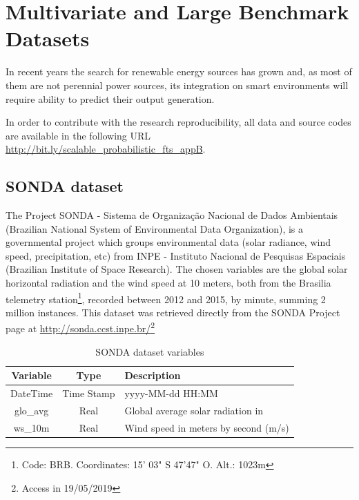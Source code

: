 \chapter{Multivariate and Large Benchmark Datasets}
\label{apd:multivariate_datasets}

In recent years the search for renewable energy sources has grown and, as most of them are not perennial power sources, its integration on smart environments will require ability to predict their output generation.

In order to contribute with the research reproducibility, all data and source codes are available in the following URL \url{http://bit.ly/scalable_probabilistic_fts_appB}.


\section{SONDA dataset}

The Project SONDA - Sistema de Organização Nacional de Dados Ambientais (Brazilian National System of Environmental Data Organization), is a governmental project which groups environmental data (solar radiance, wind speed, precipitation, etc) from INPE - Instituto Nacional de Pesquisas Espaciais (Brazilian Institute of Space Research). The chosen variables are the global solar horizontal radiation and the wind speed at 10 meters, both from the Brasilia telemetry station\footnote{Code: BRB. Coordinates: 15' 03" S 47'47" O. Alt.: 1023m}, recorded between 2012 and 2015, by minute, summing 2 million instances. This dataset was retrieved directly from the SONDA Project page at \url{http://sonda.ccst.inpe.br/}\footnote{Access in 19/05/2019}

\begin{table}[htb]
    \centering
    \begin{tabular}{|c|c|l|} \hline
        \textbf{Variable} & \textbf{Type} & \textbf{Description}  \\ \hline
        DateTime & Time Stamp & yyyy-MM-dd HH:MM  \\ \hline
        glo\_avg & Real & Global average solar radiation in   \\ \hline
        ws\_10m & Real & Wind speed in meters by second (m/s)  \\ \hline
    \end{tabular}
    \caption{SONDA dataset variables}
    \label{tab:sonda_variables}
\end{table}

